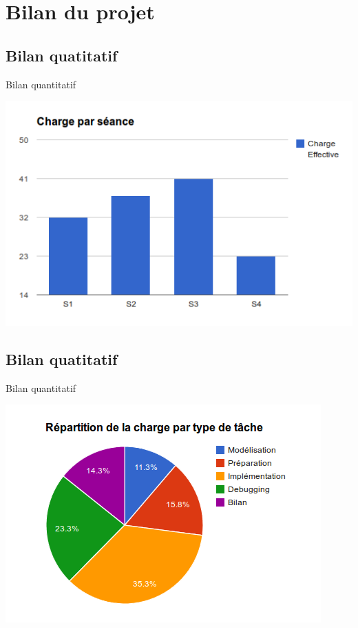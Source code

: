 \documentclass[aspectratio=169]{beamer}
\begin{document}
\section{Bilan du projet}

\subsection{Bilan quatitatif}
\begin{frame}{Bilan quantitatif}
\begin{center}
 \includegraphics[scale=0.5]{chargeseance}
\end{center}
\end{frame}

\subsection{Bilan quatitatif}
\begin{frame}{Bilan quantitatif}
 \begin{center}
 \includegraphics[scale=0.5]{chargetype}
\end{center}
\end{frame}
\end{document}
